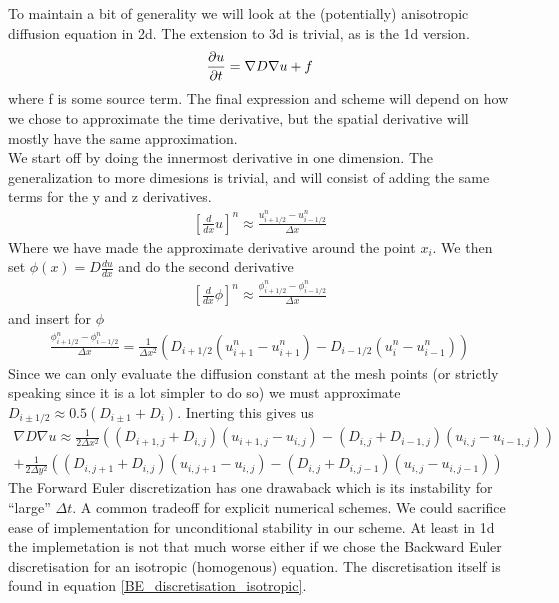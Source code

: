 To maintain a bit of generality we will look at the (potentially) anisotropic diffusion equation in 2d. The extension to 3d is trivial, as is the 1d version.
\begin{equation}
 \frac{\partial u}{\partial t} = \nabla D\nabla u +f
\end{equation}
where f is some source term. 
The final expression and scheme will depend on how we chose to approximate the time derivative, but the spatial derivative will mostly have the same approximation. \\
We start off by doing the innermost derivative in one dimension. 
The generalization to more dimesions is trivial, and will consist of adding the same terms for the y and z derivatives. 
\begin{align*}
 \left[\frac{d}{dx}u\right]^n \approx \frac{u^n_{i+1/2}-u^n_{i-1/2}}{\Delta x}
\end{align*}
Where we have made the approximate derivative around the point $x_i$. 
We then set $\phi(x)=D\frac{du}{dx}$ and do the second derivative
\begin{align*}
  \left[\frac{d}{dx}\phi\right]^n \approx \frac{\phi^n_{i+1/2}-\phi^n_{i-1/2}}{\Delta x}
\end{align*}
and insert for $\phi$
\begin{align*}
 \frac{\phi^n_{i+1/2}-\phi^n_{i-1/2}}{\Delta x} = \frac{1}{\Delta x^2}\left(D_{i+1/2}(u^n_{i+1}-u^n_{i+1}) -D_{i-1/2}(u^n_{i}-u^n_{i-1})\right)
\end{align*}
Since we can only evaluate the diffusion constant at the mesh points (or strictly speaking since it is a lot simpler to do so) we must approximate $D_{i\pm1/2}\approx0.5(D_{i\pm1}+D_i)$. 
Inerting this gives us 
\begin{align*}
 \nabla D\nabla u\approx\frac{1}{2\Delta x^2}\left((D_{i+1,j}+D_{i,j})(u_{i+1,j}-u_{i,j})-(D_{i,j}+D_{i-1,j})(u_{i,j}-u_{i-1,j})\right) \\
 +\frac{1}{2\Delta y^2}\left((D_{i,j+1}+D_{i,j})(u_{i,j+1}-u_{i,j})-(D_{i,j}+D_{i,j-1})(u_{i,j}-u_{i,j-1})\right)
\end{align*}
The Forward Euler discretization has one drawaback which is its instability for ``large'' $\Delta t$. 
A common tradeoff for explicit numerical schemes. 
We could sacrifice ease of implementation for unconditional stability in our scheme. 
At least in 1d the implemetation is not that much worse either if we chose the Backward Euler discretisation for an isotropic (homogenous) equation. 
The discretisation itself is found in equation \ref{BE_discretisation_isotropic}. 
